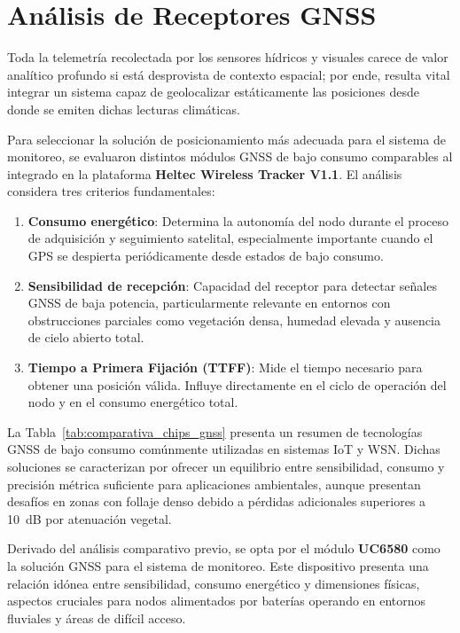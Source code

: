 \section{Análisis de Receptores GNSS}
\label{sec:analisis_gps}
Toda la telemetría recolectada por los sensores hídricos y visuales carece de valor analítico profundo si está desprovista de contexto espacial; por ende, resulta vital integrar un sistema capaz de geolocalizar estáticamente las posiciones desde donde se emiten dichas lecturas climáticas.

Para seleccionar la solución de posicionamiento más adecuada para el sistema de monitoreo, se evaluaron distintos módulos GNSS de bajo consumo comparables al integrado en la plataforma \textbf{Heltec Wireless Tracker V1.1}. El análisis considera tres criterios fundamentales:

\begin{enumerate}
    \item \textbf{Consumo energético}: Determina la autonomía del nodo durante el proceso de adquisición y seguimiento satelital, especialmente importante cuando el GPS se despierta periódicamente desde estados de bajo consumo.
    \item \textbf{Sensibilidad de recepción}: Capacidad del receptor para detectar señales GNSS de baja potencia, particularmente relevante en entornos con obstrucciones parciales como vegetación densa, humedad elevada y ausencia de cielo abierto total.
    \item \textbf{Tiempo a Primera Fijación (TTFF)}: Mide el tiempo necesario para obtener una posición válida. Influye directamente en el ciclo de operación del nodo y en el consumo energético total.
\end{enumerate}

La Tabla~\ref{tab:comparativa_chips_gnss} presenta un resumen de tecnologías GNSS de bajo consumo comúnmente utilizadas en sistemas IoT y WSN. Dichas soluciones se caracterizan por ofrecer un equilibrio entre sensibilidad, consumo y precisión métrica suficiente para aplicaciones ambientales, aunque presentan desafíos en zonas con follaje denso debido a pérdidas adicionales superiores a \SI{10}{dB} por atenuación vegetal.



Derivado del análisis comparativo previo, se opta por el módulo \textbf{UC6580} como la solución GNSS para el sistema de monitoreo. Este dispositivo presenta una relación idónea entre sensibilidad, consumo energético y dimensiones físicas, aspectos cruciales para nodos alimentados por baterías operando en entornos fluviales y áreas de difícil acceso.


